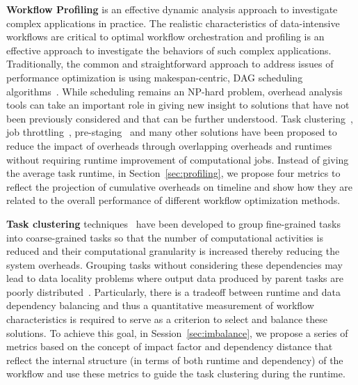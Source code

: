 \textbf{Workflow Profiling} is an effective dynamic analysis approach to investigate complex applications in practice. The realistic characteristics of data-intensive workflows are critical to optimal workflow orchestration and profiling is an effective approach to investigate the behaviors of such complex applications. Traditionally, the common and straightforward approach to address issues of performance optimization is using makespan-centric, DAG scheduling algorithms~\cite{Caniou2011}. While scheduling remains an NP-hard problem, overhead analysis tools can take an important role in giving new insight to solutions that have not been previously considered and that can be further understood. Task clustering~\cite{Chen2012}, job throttling~\cite{Humphrey2008}, pre-staging~\cite{Amer2012} and many other solutions have been proposed to reduce the impact of overheads through overlapping overheads and runtimes without requiring runtime improvement of computational jobs. Instead of giving the average task runtime, in Section~\ref{sec:profiling}, we propose four metrics to reflect the projection of cumulative overheads on timeline and show how they are related to the overall performance of different workflow optimization methods.    


\textbf{Task clustering} techniques~\cite{Ostberg2011, Chen2012, Maheshwari2012, Ferreira-granularity-2013} have been developed to group ﬁne-grained tasks into coarse-grained tasks so that the number of computational activities is reduced and their computational granularity is increased thereby reducing the system overheads. Grouping tasks without considering these dependencies may lead to data locality problems where output data produced by parent tasks are poorly distributed~\cite{Chen-balanced-2013}. Particularly, there is a tradeoff between runtime and data dependency balancing and thus a quantitative measurement of workﬂow characteristics is required to serve as a criterion to select and balance these solutions. To achieve this goal, in Session~\ref{sec:imbalance}, we propose a series of metrics based on the concept of impact factor and dependency distance that reﬂect the internal structure (in terms of both runtime and dependency) of the workﬂow  and use these metrics to guide the task clustering during the runtime. 


